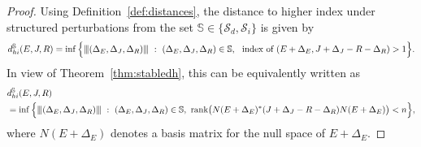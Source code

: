 \documentclass[11pt]{article}
\newcommand{\nnrm}[1]{{\left\vert\kern-0.25ex\left\vert\kern-0.25ex\left\vert #1
		\right\vert\kern-0.25ex\right\vert\kern-0.25ex\right\vert}}
\begin{document}
\begin{proof}
    Using Definition~\eqref{def:distances}, the distance to higher index under structured perturbations from the set $\mathbb S\in \{\mathcal S_d,\mathcal S_i\}$ is given by
    \[
    d_{hi}^{\mathbb S}(E,J,R) = \inf\Big\{\nnrm{(\Delta_E,\Delta_J,\Delta_R)} ~:~ (\Delta_E,\Delta_J,\Delta_R)\in \mathbb S,~ \text{ index of } (E+\Delta_E,J+\Delta_J-R-\Delta_R) > 1 \Big\}.
    \]
    In view of Theorem~\ref{thm:stabledh}, this can be equivalently written as
    \begin{align*}
        &d_{hi}^{\mathbb S}(E,J,R) \\ &= \inf\Big\{ \nnrm{(\Delta_E,\Delta_J,\Delta_R)} ~:~ (\Delta_E,\Delta_J,\Delta_R)\in \mathbb S,~ \text{rank}\big(N(E+\Delta_E)^* (J+\Delta_J-R-\Delta_R) N(E+\Delta_E) \big) < n \Big\},
    \end{align*}
    where $N(E+\Delta_E)$ denotes a basis matrix for the null space of $E+\Delta_E$.


\end{proof}
\end{document}

